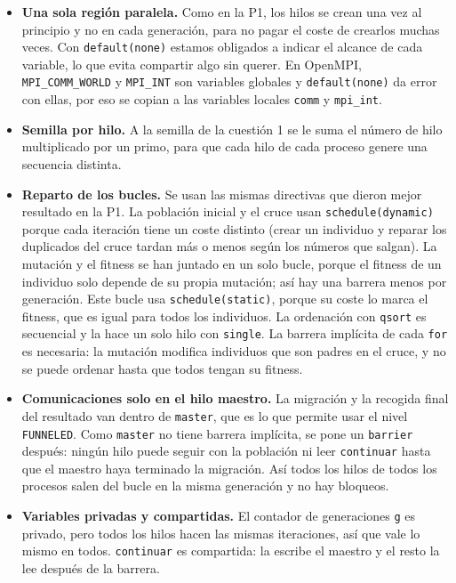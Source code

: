 \documentclass[12pt]{article}
\begin{document}
\begin{enumerate}
\begin{itemize}
    \item \textbf{Una sola región paralela.} Como en la P1, los hilos se crean una vez al principio y no en cada generación, para no pagar el coste de crearlos muchas veces. Con \texttt{default(none)} estamos obligados a indicar el alcance de cada variable, lo que evita compartir algo sin querer. En OpenMPI, \texttt{MPI\_COMM\_WORLD} y \texttt{MPI\_INT} son variables globales y \texttt{default(none)} da error con ellas, por eso se copian a las variables locales \texttt{comm} y \texttt{mpi\_int}.
    \item \textbf{Semilla por hilo.} A la semilla de la cuestión 1 se le suma el número de hilo multiplicado por un primo, para que cada hilo de cada proceso genere una secuencia distinta.
    \item \textbf{Reparto de los bucles.} Se usan las mismas directivas que dieron mejor resultado en la P1. La población inicial y el cruce usan \texttt{schedule(dynamic)} porque cada iteración tiene un coste distinto (crear un individuo y reparar los duplicados del cruce tardan más o menos según los números que salgan). La mutación y el fitness se han juntado en un solo bucle, porque el fitness de un individuo solo depende de su propia mutación; así hay una barrera menos por generación. Este bucle usa \texttt{schedule(static)}, porque su coste lo marca el fitness, que es igual para todos los individuos. La ordenación con \texttt{qsort} es secuencial y la hace un solo hilo con \texttt{single}. La barrera implícita de cada \texttt{for} es necesaria: la mutación modifica individuos que son padres en el cruce, y no se puede ordenar hasta que todos tengan su fitness.
    \item \textbf{Comunicaciones solo en el hilo maestro.} La migración y la recogida final del resultado van dentro de \texttt{master}, que es lo que permite usar el nivel \texttt{FUNNELED}. Como \texttt{master} no tiene barrera implícita, se pone un \texttt{barrier} después: ningún hilo puede seguir con la población ni leer \texttt{continuar} hasta que el maestro haya terminado la migración. Así todos los hilos de todos los procesos salen del bucle en la misma generación y no hay bloqueos.
    \item \textbf{Variables privadas y compartidas.} El contador de generaciones \texttt{g} es privado, pero todos los hilos hacen las mismas iteraciones, así que vale lo mismo en todos. \texttt{continuar} es compartida: la escribe el maestro y el resto la lee después de la barrera.
\end{itemize}


\end{enumerate}
\end{document}
